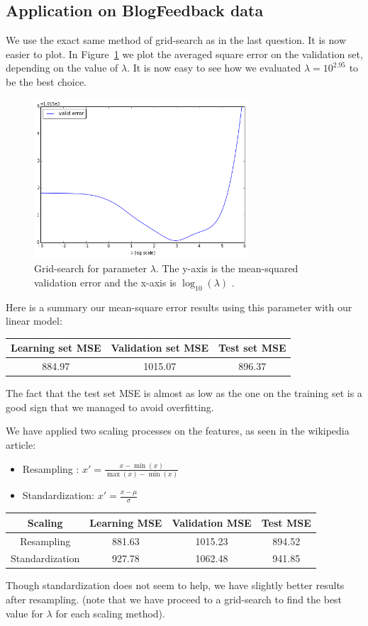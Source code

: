 \subsection{Application on BlogFeedback data}
We use the exact same method of grid-search as in the last question. It is now easier to plot. In Figure~\ref{fig:grid} we plot the averaged square error on the validation set, depending on the value of $\lambda$. It is now easy to see how we evaluated $\lambda = 10^{2.95}$ to be the best choice.
\begin{figure}[h]
  \centering
 \includegraphics[width=8cm]{../Figures/Q3/grid.png}
\caption{Grid-search for parameter $\lambda$. The y-axis is the mean-squared validation error and the x-axis is $\log_{10}(\lambda)$ .}
\label{fig:grid}
\end{figure}

Here is a summary our mean-square error results using this parameter with our linear model:
\begin{center}
  \begin{tabular}{| c  | c |c |}
    \hline
 Learning set MSE & Validation set MSE &  Test set MSE \\ \hline
 884.97  &  1015.07 & 896.37 \\
    \hline
  \end{tabular}
\end{center}
The fact that the test set MSE is almost as low as the one on the training set is a good sign that we managed to avoid overfitting.

We have applied two scaling processes on the features, as seen in the wikipedia article:
\begin{itemize}
    \item Resampling : $x' = \frac{x - \min(x)}{\max(x)-\min(x)}$
    \item Standardization: $x' = \frac{x - \mu}{\sigma}$
\end{itemize}
\begin{center}
  \begin{tabular}{| c | c  | c | c |}
    \hline
 Scaling &  Learning MSE & Validation MSE &  Test MSE  \\ \hline
 Resampling & 881.63  &  1015.23 & 894.52 \\
 Standardization & 927.78  &  1062.48 & 941.85 \\
    \hline
  \end{tabular}
\end{center}
Though standardization does not seem to help, we have slightly better results after resampling. (note that we have proceed to a grid-search to find the best value for $\lambda$ for each scaling method).
